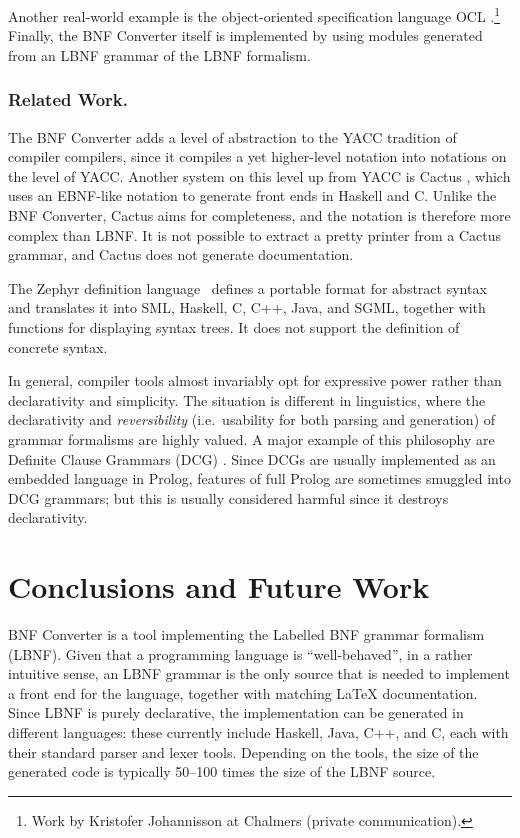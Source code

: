 \documentclass{llncs}
\newcommand{\shortsection}[1]{\subsubsection*{#1.}} %
\begin{document}
Another real-world example is the
object-oriented specification language OCL
\cite{WarmerKleppe99}.\footnote{
Work by Kristofer Johannisson at Chalmers (private communication).} 
Finally, the BNF Converter itself is implemented by 
using modules generated from an LBNF grammar of the LBNF formalism.




\shortsection{Related Work}

The BNF Converter adds a level of abstraction to the YACC \cite{johnson-yacc} 
tradition of compiler compilers,
since it compiles a yet higher-level notation into
notations on the level of YACC.
Another system on this 
level up from YACC is Cactus \cite{Cactus},
which uses an EBNF-like notation to 
generate front ends in Haskell and C.
Unlike the BNF Converter, Cactus aims for completeness,
and the notation is therefore more complex than LBNF. 
It is not possible to extract a pretty printer from a Cactus grammar, 
and Cactus does not generate documentation.

The Zephyr definition language 
\cite{zephyr}\ defines a portable format for abstract syntax
and translates it into SML, Haskell, C, C++,
Java, and SGML, together with functions for displaying syntax trees. It does not support the definition of concrete syntax.

In general, compiler tools almost invariably opt for expressive power 
rather than declarativity and simplicity.
The situation is different in linguistics, where
the declarativity and \textit{reversibility} (i.e.\ usability for both
parsing and generation) of grammar formalisms are highly valued. A major 
example of this philosophy are Definite Clause Grammars (DCG) 
\cite{dcg}. Since DCGs are usually implemented as an embedded 
language in Prolog, 
features of full Prolog are sometimes smuggled into DCG grammars;
but this is usually considered harmful since it destroys
declarativity.



\section{Conclusions and Future Work}

BNF Converter is a tool implementing the Labelled BNF grammar formalism
(LBNF). Given that a programming language is
``well-behaved'', in a rather intuitive sense, an
LBNF grammar is the only source that is needed to implement
a front end for the language, together with matching
LaTeX documentation. Since LBNF is purely declarative, 
the implementation can be generated in different languages:
these currently include Haskell, Java, C++, and C, each with
their standard parser and lexer tools. Depending on
the tools, the size of the generated code is typically 
50--100 times the size of the LBNF source.
\end{document}
